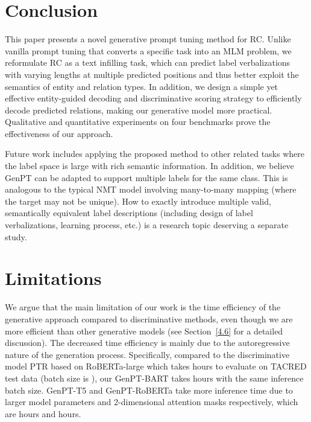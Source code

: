 \documentclass[11pt]{article}
\begin{document}
\section{Conclusion}
This paper presents a novel generative prompt tuning method for RC. Unlike vanilla prompt tuning that converts a specific task into an MLM problem, we reformulate RC as a text infilling task, which can predict label verbalizations with varying lengths at multiple predicted positions and thus better exploit the semantics of entity and relation types. In addition, we design a simple yet effective entity-guided decoding and discriminative scoring strategy to efficiently decode predicted relations, making our generative model more practical. Qualitative and quantitative experiments on four benchmarks prove the effectiveness of our approach. 

Future work includes applying the proposed method to other related tasks where the label space is large with rich semantic information. In addition, we believe GenPT can be adapted to support multiple labels for the same class. This is analogous to the typical NMT model involving many-to-many mapping (where the target may not be unique). How to exactly introduce multiple valid, semantically equivalent label descriptions (including design of label verbalizations, learning process, etc.) is a research topic deserving a separate study.


\section*{Limitations}\label{limitations}
We argue that the main limitation of our work is the time efficiency of the generative approach compared to discriminative methods, even though we are more efficient than other generative models (see Section~\ref{4.6} for a detailed discussion). The decreased time efficiency is mainly due to the autoregressive nature of the generation process. Specifically, compared to the discriminative model PTR based on RoBERTa-large which takes  hours to evaluate on TACRED test data (batch size is ), our GenPT-BART takes  hours with the same inference batch size. GenPT-T5 and GenPT-RoBERTa take more inference time due to larger model parameters and 2-dimensional attention masks respectively, which are  hours and  hours.
\end{document}
